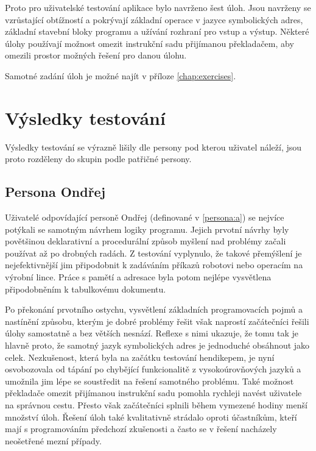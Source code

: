 Proto pro uživatelské testování aplikace bylo navrženo šest úloh. Jsou navrženy se vzrůstající obtížností a pokrývají základní operace v jazyce symbolických adres, základní stavební bloky programu a užívání rozhraní pro vstup a výstup. Některé úlohy používají možnost omezit instrukční sadu přijímanou překladačem, aby omezili prostor možných řešení pro danou úlohu.

Samotné zadání úloh je možné najít v příloze \ref{chap:exercises}.

\section{Výsledky testování}

Výsledky testování se výrazně lišily dle persony pod kterou uživatel náleží, jsou proto rozděleny do skupin podle patřičné persony.

\subsection{Persona Ondřej}

Uživatelé odpovídající personě Ondřej (definované v \ref{persona:a}) se nejvíce potýkali se samotným návrhem logiky programu. Jejich prvotní návrhy byly povětšinou deklarativní a procedurální způsob myšlení nad problémy začali používat až po drobných radách. Z testování vyplynulo, že takové přemýšlení je nejefektivnější jim připodobnit k zadáváním příkazů robotovi nebo operacím na výrobní lince. Práce s pamětí a adresace byla potom nejlépe vysvětlena připodobněním k tabulkovému dokumentu.

Po překonání prvotního ostychu, vysvětlení základních programovacích pojmů a nastínění způsobu, kterým je dobré problémy řešit však naprostí začátečníci řešili úlohy samostatně a bez větších nesnází. Reflexe s nimi ukazuje, že tomu tak je hlavně proto, že samotný jazyk symbolických adres je jednoduché obsáhnout jako celek. Nezkušenost, která byla na začátku testování hendikepem, je nyní osvobozovala od tápání po chybějící funkcionalitě z vysokoúrovňových jazyků a umožnila jim lépe se soustředit na řešení samotného problému. Také možnost překladače omezit přijímanou instrukční sadu pomohla rychleji navést uživatele na správnou cestu. Přesto však začátečníci splnili během vymezené hodiny menší množství úloh. Řešení úloh také kvalitativně strádalo oproti účastníkům, kteří mají s programováním předchozí zkušenosti a často se v řešení nacházely neošetřené mezní případy.

